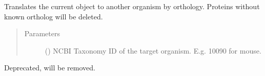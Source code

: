 \documentclass[letterpaper,10pt,english]{sphinxmanual}
\begin{document}
\begin{fulllineitems}
\begin{fulllineitems}
\begin{quote}
\begin{description}
\end{description}\end{quote}

\end{fulllineitems}


\begin{fulllineitems}
\label{\detokenize{reference:pypath.main.PyPath.homology_translation}}
Translates the current object to another organism by orthology.
Proteins without known ortholog will be deleted.
\begin{quote}\begin{description}
\item[{Parameters}] \leavevmode
{} () \textendash{} NCBI Taxonomy ID of the target organism. E.g. 10090 for mouse.

\end{description}\end{quote}

\end{fulllineitems}


\begin{fulllineitems}
\label{\detokenize{reference:pypath.main.PyPath.htp_stats}}
\end{fulllineitems}


\begin{fulllineitems}
\label{\detokenize{reference:pypath.main.PyPath.in_complex}}
Deprecated, will be removed.

\end{fulllineitems}



\end{fulllineitems}
\end{document}
